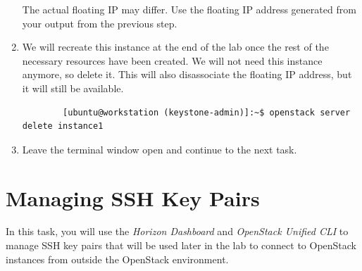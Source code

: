 \documentclass[letterpaper, 12pt]{article}
\begin{document}
\begin{enumerate}
    \begin{notebox}
        The actual floating IP may differ.
        Use the floating IP address generated from your output from the previous step.
    \end{notebox}

    \item We will recreate this instance at the end of the lab once the rest of the necessary resources have been created.
    We will not need this instance anymore, so delete it.
    This will also disassociate the floating IP address, but it will still be available.
    \begin{lstlisting}
        [ubuntu@workstation (keystone-admin)]:~$ openstack server delete instance1
    \end{lstlisting}

    \item Leave the terminal window open and continue to the next task.

\end{enumerate}

\section{Managing SSH Key Pairs}
\label{sec:managing_ssh_key_pairs}
In this task, you will use the \textit{Horizon Dashboard} and \textit{OpenStack Unified CLI} to manage SSH key pairs that will be used later in the lab to connect to OpenStack instances from outside the OpenStack environment.
\end{document}
